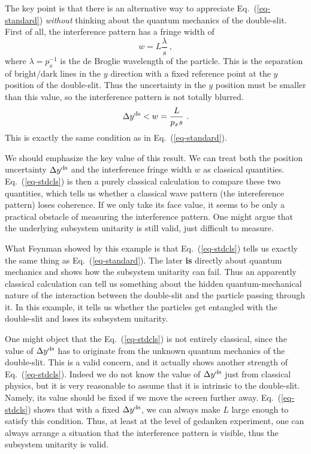 \documentclass[aps,showpacs,onecolumn,floats,prd,superscriptaddress,nofootinbib]{revtex4-1}
\begin{document}
The key point is that there is an alternative way to appreciate Eq.~(\ref{eq-standard}) {\it without} thinking about the quantum mechanics of the double-slit. 
First of all, the interference pattern has a fringe width of  
\begin{equation}
w = L\frac{\lambda}{s}~,
\end{equation}
where $\lambda = p_x^{-1}$ is the de Broglie wavelength of the particle. This is the separation of bright/dark lines in the $y$ direction with a fixed reference point at the $y$ position of the double-slit. Thus the uncertainty in the $y$ position must be smaller than this value, so the interference pattern is not totally blurred.
\begin{equation}
\Delta y^{\rm ds} < w = \frac{L}{p_xs}~.
\label{eq-stdcls}
\end{equation}
This is exactly the same condition as in Eq.~(\ref{eq-standard}).

We should emphasize the key value of this result. 
We can treat both the position uncertainty $\Delta y^{\rm ds}$ and the interference fringe width $w$ as classical quantities. Eq.~(\ref{eq-stdcls}) is then a purely classical calculation to compare these two quantities, which tells us whether a classical wave pattern (the intereference pattern) loses coherence. 
If we only take its face value, it seems to be only a practical obstacle of measuring the interference pattern. 
One might argue that the underlying subsystem unitarity is still valid, just difficult to measure. 

What Feynman showed by this example is that Eq.~(\ref{eq-stdcls}) tells us exactly the same thing as Eq.~(\ref{eq-standard}). 
The later {\bf is} directly about quantum mechanics and shows how the subsystem unitarity can fail. 
Thus an apparently classical calculation can tell us something about the hidden quantum-mechanical nature of the interaction between the double-slit and the particle passing through it. 
In this example, it tells us whether the particles get entangled with the double-slit and loses its subsystem unitarity. 

One might object that the Eq.~(\ref{eq-stdcls}) is not entirely classical, since the value of $\Delta y^{\rm ds}$ has to originate from the unknown quantum mechanics of the double-slit. 
This is a valid concern, and it actually shows another strength of Eq.~(\ref{eq-stdcls}). 
Indeed we do not know the value of $\Delta y^{\rm ds}$ just from classical physics, but it is very reasonable to assume that it is intrinsic to the double-slit. 
Namely, its value should be fixed if we move the screen further away. Eq.~(\ref{eq-stdcls}) shows that with a fixed $\Delta y^{\rm ds}$, we can always make $L$ large enough to satisfy this condition. 
Thus, at least at the level of gedanken experiment, one can always arrange a situation that the interference pattern is visible, thus the subsystem unitarity is valid.
\end{document}
